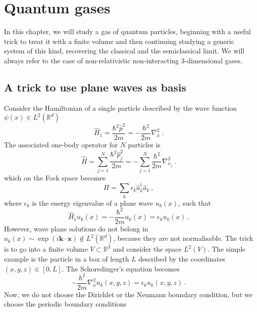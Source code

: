 \chapter{Quantum gases}

    In this chapter, we will study a gas of quantum particles, beginning with a useful trick to treat it with a finite volume and then continuing studying a generic system of this kind, recovering the classical and the semiclassical limit. We will always refer to the case of non-relativistic non-interacting $3$-dimensional gases.

\section{A trick to use plane waves as basis}

    Consider the Hamiltonian of a single particle described by the wave function $\psi (x) \in L^2 (\mathbb R^d)$ 
    \begin{equation*}
        \hat H_1 = \frac{\hbar^2 \hat p^2}{2m} = - \frac{\hbar^2}{2m} \nabla_x^2 ~.
    \end{equation*}
    The associated one-body operator for $N$ particles is 
    \begin{equation*}
        \hat H = \sum_{j = 1}^{N} \frac{\hbar^2 \hat p_j^2}{2m} = - \sum_{j = 1}^{N} \frac{\hbar^2}{2m} \nabla^2_{x_j} ~.
    \end{equation*}
    which on the Fock space becomes
    \begin{equation*}
        H = \sum_k \epsilon_k \hat a_k^\dagger \hat a_k ~,
    \end{equation*}
    where $\epsilon_k$ is the energy eigenvalue of a plane wave $u_k (x)$, such that
    \begin{equation*}
        \hat H_1 u_k (x) = - \frac{\hbar^2}{2m} u_k (x) = \epsilon_k u_k (x) ~.
    \end{equation*}
    However, wave plane solutions do not belong in $u_k(x) \sim \exp(i \mathbf k \cdot \mathbf x) \notin L^2 (\mathbb R^d)$, because they are not normalisable. The trick is to go into a finite volume $V \subset \mathbb R^3$ and consider the space $L^2(V)$. The simple example is the particle in a box of length $L$ described by the coordinates $(x,y,z) \in [0, L]$. The Schoredinger's equation becomes 
    \begin{equation*}
        - \frac{\hbar^2}{2m} \nabla_x^2 u_k (x,y,z) = \epsilon_k u_k (x,y,z) ~.
    \end{equation*}
    Now, we do not choose the Dirichlet or the Neumann boundary condition, but we choose the periodic boundary conditions 
